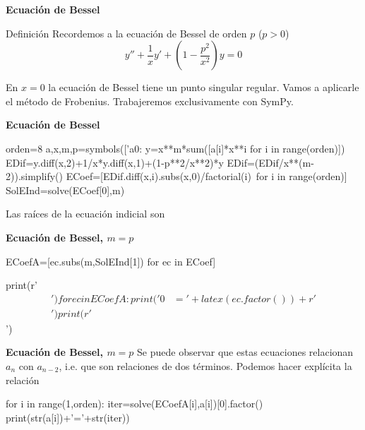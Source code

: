 \begin{frame}[fragile]{\textbf{Ecuación de Bessel}}

\begin{block}{Definición} Recordemos a la ecuación de Bessel de orden $p$ ($p>0$)
 \[y''+\frac{1}{x}y'+\left(1-\frac{p^2}{x^2}\right)y=0\]
\end{block}

En $x=0$ la ecuación de Bessel tiene un punto  singular regular. Vamos a aplicarle el método de Frobenius. Trabajeremos exclusivamente con SymPy.
\end{frame}


\begin{frame}[fragile]{\textbf{Ecuación de Bessel}}
\begin{sympyblock}[][numbers=left,frame=single,framesep=5mm]
orden=8
a,x,m,p=symbols(['a0:%
y=x**m*sum([a[i]*x**i for i in range(orden)])
EDif=y.diff(x,2)+1/x*y.diff(x,1)+(1-p**2/x**2)*y
EDif=(EDif/x**(m-2)).simplify()
ECoef=[EDif.diff(x,i).subs(x,0)/factorial(i)\
    for i in range(orden)]
SolEInd=solve(ECoef[0],m)
\end{sympyblock}

Las raíces de la ecuación indicial son
\end{frame}




\begin{frame}[fragile]{\textbf{Ecuación de Bessel, $m=p$}}



\begin{sympyblock}[][numbers=left,frame=single,framesep=5mm]
ECoefA=[ec.subs(m,SolEInd[1]) for ec in ECoef]
\end{sympyblock}

\begin{sympycode}[][numbers=left,frame=single,framesep=5mm]
print(r'\begin{align*}') 
for ec in ECoefA:
    print('0&='+latex(ec.factor())+r'\\') 
print(r'\end{align*}')
\end{sympycode}




\end{frame}


\begin{frame}[fragile]{\textbf{Ecuación de Bessel, $m=p$}}
Se puede observar que estas ecuaciones relacionan  $a_n$ con $a_{n-2}$, i.e. que son relaciones de dos términos.  Podemos hacer explícita la relación





\begin{sympyblock}[][numbers=left,frame=single,framesep=5mm]
for i in range(1,orden):
    iter=solve(ECoefA[i],a[i])[0].factor()
    print(str(a[i])+'='+str(iter))
\end{sympyblock}
\end{frame}


